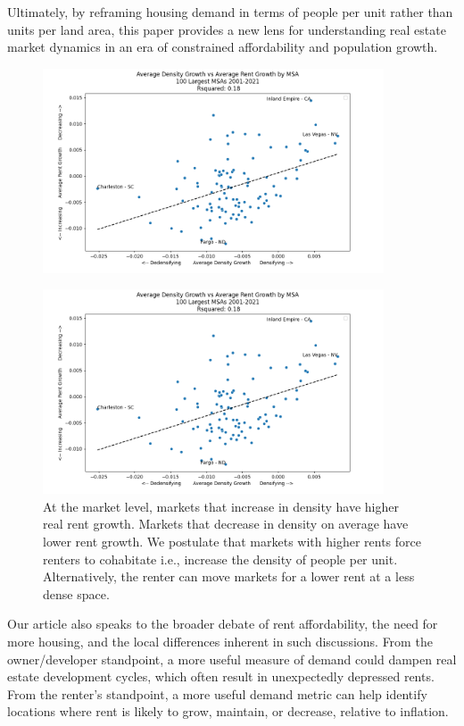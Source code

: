 \documentclass[sn-mathphys-num]{sn-jnl}%
\begin{document}
Ultimately, by reframing housing demand in terms of people per unit rather than units per land area, this paper provides a new lens for understanding real estate market dynamics in an era of constrained affordability and population growth.

\begin{figure}
	\includegraphics*[width=0.9\textwidth]{density_growth_vs_rent_growth.png}
\end{figure}

\begin{figure}[H]
	\centering
	\includegraphics*[width=0.9\textwidth]{density_growth_vs_rent_growth.png}
	\caption*{At the market level, markets that increase in density have higher real rent growth. Markets that decrease in density on average have lower rent growth. We postulate that markets with higher rents force renters to cohabitate i.e., increase the density of people per unit. Alternatively, the renter can move markets for a lower rent at a less dense space.}\label{fig1}
\end{figure}



Our article also speaks to the broader debate of rent affordability, the need for more housing, and the local differences inherent in such discussions. From the owner/developer standpoint, a more useful measure of demand could dampen real estate development cycles, which often result in unexpectedly depressed rents. From the renter's standpoint, a more useful demand metric can help identify locations where rent is likely to grow, maintain, or decrease, relative to inflation.  
\end{document}
